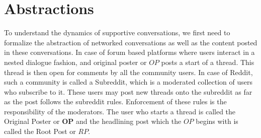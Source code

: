 \section{Abstractions}
\label{Sec:Abstractions}
To understand the dynamics of supportive conversations, we first need to formalize the abstraction of networked conversations as well as the content posted in these conversations. In case of forum based platforms where users interact in a nested dialogue fashion, and original poster or $OP$ posts a start of a thread. This thread is then open for comments by all the community users. In case of Reddit, such a community is called a Subreddit, which is a moderated collection of users who subscribe to it. These users may post new threads onto the subreddit as far as the post follows the subreddit rules. Enforcement of these rules is the responsibility of the moderators. The user who starts a thread is called the Original Poster or \textbf{OP} and the headlining post which the $OP$ begins with is called the Root Post or $RP$. 


\label{Sec:network}

